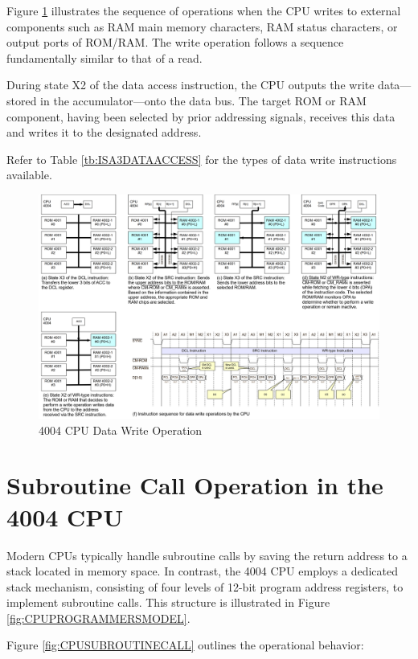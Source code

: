 Figure \ref{fig:CPUINSTRUCTIONWRITE} illustrates the sequence of operations when the CPU writes to external components such as RAM main memory characters, RAM status characters, or output ports of ROM/RAM. The write operation follows a sequence fundamentally similar to that of a read.

During state X2 of the data access instruction, the CPU outputs the write data—stored in the accumulator—onto the data bus. The target ROM or RAM component, having been selected by prior addressing signals, receives this data and writes it to the designated address.

Refer to Table \ref{tb:ISA3DATAACCESS} for the types of data write instructions available.
\begin{figure}[htbp]
    \includegraphics[width=1.0\columnwidth]{./Figure/CPUInstructionWrite.png}
    \caption{4004 CPU Data Write Operation}
    \label{fig:CPUINSTRUCTIONWRITE}
\end{figure}

\section{Subroutine Call Operation in the 4004 CPU}
Modern CPUs typically handle subroutine calls by saving the return address to a stack located in memory space. In contrast, the 4004 CPU employs a dedicated stack mechanism, consisting of four levels of 12-bit program address registers, to implement subroutine calls. This structure is illustrated in Figure \ref{fig:CPUPROGRAMMERSMODEL}.

Figure \ref{fig:CPUSUBROUTINECALL} outlines the operational behavior:

